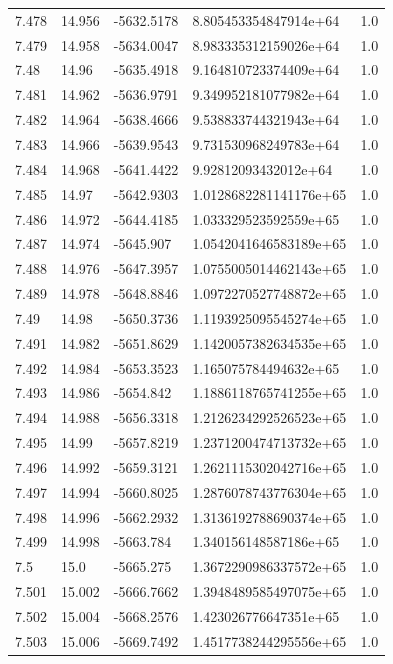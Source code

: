 \begin{tabular}{lllll}
7.478 & 14.956 & -5632.5178 & 8.805453354847914e+64 & 1.0 \\
7.479 & 14.958 & -5634.0047 & 8.983335312159026e+64 & 1.0 \\
7.48 & 14.96 & -5635.4918 & 9.164810723374409e+64 & 1.0 \\
7.481 & 14.962 & -5636.9791 & 9.349952181077982e+64 & 1.0 \\
7.482 & 14.964 & -5638.4666 & 9.538833744321943e+64 & 1.0 \\
7.483 & 14.966 & -5639.9543 & 9.731530968249783e+64 & 1.0 \\
7.484 & 14.968 & -5641.4422 & 9.92812093432012e+64 & 1.0 \\
7.485 & 14.97 & -5642.9303 & 1.0128682281141176e+65 & 1.0 \\
7.486 & 14.972 & -5644.4185 & 1.033329523592559e+65 & 1.0 \\
7.487 & 14.974 & -5645.907 & 1.0542041646583189e+65 & 1.0 \\
7.488 & 14.976 & -5647.3957 & 1.0755005014462143e+65 & 1.0 \\
7.489 & 14.978 & -5648.8846 & 1.0972270527748872e+65 & 1.0 \\
7.49 & 14.98 & -5650.3736 & 1.1193925095545274e+65 & 1.0 \\
7.491 & 14.982 & -5651.8629 & 1.1420057382634535e+65 & 1.0 \\
7.492 & 14.984 & -5653.3523 & 1.165075784494632e+65 & 1.0 \\
7.493 & 14.986 & -5654.842 & 1.1886118765741255e+65 & 1.0 \\
7.494 & 14.988 & -5656.3318 & 1.2126234292526523e+65 & 1.0 \\
7.495 & 14.99 & -5657.8219 & 1.2371200474713732e+65 & 1.0 \\
7.496 & 14.992 & -5659.3121 & 1.2621115302042716e+65 & 1.0 \\
7.497 & 14.994 & -5660.8025 & 1.2876078743776304e+65 & 1.0 \\
7.498 & 14.996 & -5662.2932 & 1.3136192788690374e+65 & 1.0 \\
7.499 & 14.998 & -5663.784 & 1.340156148587186e+65 & 1.0 \\
7.5 & 15.0 & -5665.275 & 1.3672290986337572e+65 & 1.0 \\
7.501 & 15.002 & -5666.7662 & 1.3948489585497075e+65 & 1.0 \\
7.502 & 15.004 & -5668.2576 & 1.423026776647351e+65 & 1.0 \\
7.503 & 15.006 & -5669.7492 & 1.4517738244295556e+65 & 1.0 \\

\end{tabular}
